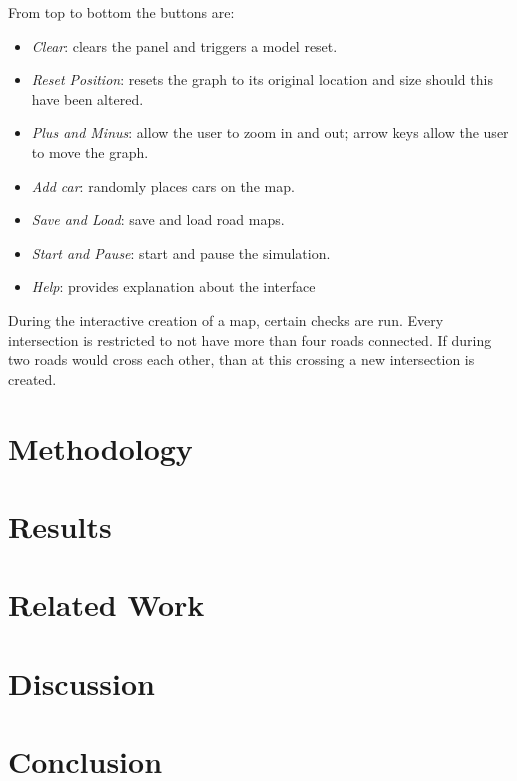 \documentclass[10pt]{article}
\begin{document}
From top to bottom the buttons are:
\begin{itemize}
	\setlength\itemsep{0.2em}
	\item \textit{Clear}: clears the panel and triggers a model reset.
	\item \textit{Reset Position}: resets the graph to its original location and size should this have been altered.
	\item \textit{Plus and Minus}: allow the user to zoom in and out; arrow keys allow the user to move the graph.
	\item \textit{Add car}: randomly places cars on the map.
	\item \textit{Save and Load}: save and load road maps. 
	\item \textit{Start and Pause}: start and pause the simulation.
	\item \textit{Help}: provides explanation about the interface
\end{itemize}

During the interactive creation of a map, certain checks are run. Every intersection is restricted to not have more than four roads connected. If during two roads would cross each other, than at this crossing a new intersection is created.
	
\section{Methodology}

\section{Results}

\section{Related Work}

\section{Discussion}
	
\section{Conclusion}

{\tiny\printbibliography}
\end{document}
